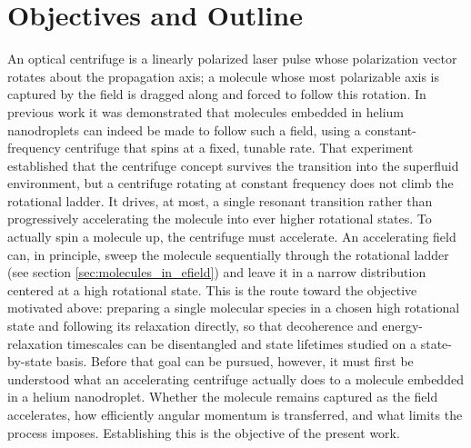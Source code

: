 \section{Objectives and Outline}
\label{sec:outline}
An optical centrifuge is a linearly polarized laser pulse whose polarization vector rotates about the propagation axis; a molecule whose most polarizable axis is captured by the field is dragged along and forced to follow this rotation. In previous work \cite{macphail-bartleyControlMolecularRotation2026a} it was demonstrated that molecules embedded in helium nanodroplets can indeed be made to follow such a field, using a constant-frequency centrifuge that spins at a fixed, tunable rate. That experiment established that the centrifuge concept survives the transition into the superfluid environment, but a centrifuge rotating at constant frequency does not climb the rotational ladder. It drives, at most, a single resonant transition rather than progressively accelerating the molecule into ever higher rotational states.
To actually spin a molecule up, the centrifuge must accelerate. An accelerating field can, in principle, sweep the molecule sequentially through the rotational ladder (see section \ref{sec:molecules_in_efield}) and leave it in a narrow distribution centered at a high rotational state. This is the route toward the objective motivated above: preparing a single molecular species in a chosen high rotational state and following its relaxation directly, so that decoherence and energy-relaxation timescales can be disentangled and state lifetimes studied on a state-by-state basis.
Before that goal can be pursued, however, it must first be understood what an accelerating centrifuge actually does to a molecule embedded in a helium nanodroplet. Whether the molecule remains captured as the field accelerates, how efficiently angular momentum is transferred, and what limits the process imposes. Establishing this is the objective of the present work.
